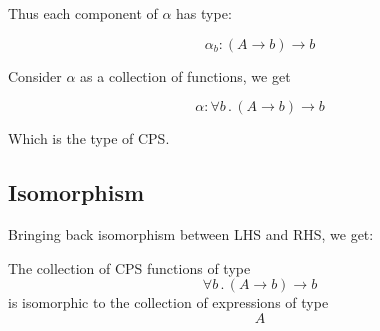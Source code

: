 \documentclass[11pt]{article}
\begin{document}
Thus each component of \(\alpha\) has type:

\[ \alpha_b : (A \to b) \to b \]

Consider \(\alpha\) as a collection of functions, we get

\[\alpha : \forall b \,.\, (A \to b) \to b\]

Which is the type of CPS.

\subsection{Isomorphism}
\label{sec:orgc883ade}
Bringing back isomorphism between LHS and RHS, we get:

\begin{center}
The collection of CPS functions of type
\[\forall b \,.\, (A \to b) \to b\] 
is isomorphic to the collection of expressions of type
\[A\]
\end{center}
\end{document}
